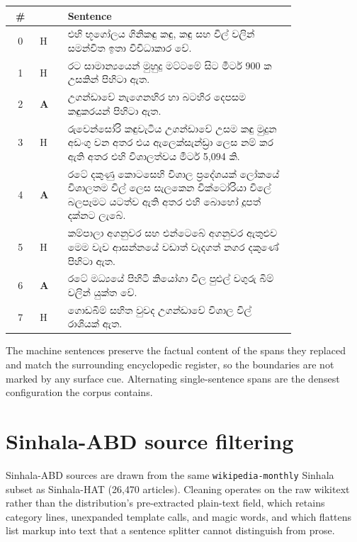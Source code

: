 \begin{table}[h]
\centering\small
\begin{tabular}{@{}cl p{0.80\linewidth}@{}}
\toprule
\# & & Sentence \\
\midrule
0 & H & \si{එහි භූගෝලය ගිනිකඳු කඳු, කඳු සහ විල් වලින් සමන්විත ඉතා විවිධාකාර වේ.} \\[2pt]
1 & H & \si{රට සාමාන්‍යයෙන් මුහුදු මට්ටමේ සිට මීටර් 900 ක උසකින් පිහිටා ඇත.} \\[2pt]
2 & \textbf{A} & \si{උගන්ඩාවේ නැගෙනහිර හා බටහිර දෙපසම කඳුකරයන් පිහිටා ඇත.} \\[2pt]
3 & H & \si{රුවෙන්සෝරි කඳුවැටිය උගන්ඩාවේ උසම කඳු මුදුන අඩංගු වන අතර එය ඇලෙක්සැන්ඩ්‍රා ලෙස නම් කර ඇති අතර එහි විශාලත්වය මීටර් 5,094 කි.} \\[2pt]
4 & \textbf{A} & \si{රටේ දකුණු කොටසෙහි විශාල ප්‍රදේශයක් ලෝකයේ විශාලතම විල් ලෙස සැලකෙන වික්ටෝරියා විලේ බලපෑමට යටත්ව ඇති අතර එහි බොහෝ දූපත් දක්නට ලැබේ.} \\[2pt]
5 & H & \si{කම්පාලා අගනුවර සහ එන්ටෙබේ අගනුවර ඇතුළුව මෙම වැව ආසන්නයේ වඩාත් වැදගත් නගර දකුණේ පිහිටා ඇත.} \\[2pt]
6 & \textbf{A} & \si{රටේ මධ්‍යයේ පිහිටි කියෝගා විල පුළුල් වගුරු බිම් වලින් යුක්ත වේ.} \\[2pt]
7 & H & \si{ගොඩබිම් සහිත වුවද උගන්ඩාවේ විශාල විල් රාශියක් ඇත.} \\
\bottomrule
\end{tabular}
\end{table}

\noindent The machine sentences preserve the factual content of the spans they
replaced and match the surrounding encyclopedic register, so the boundaries are
not marked by any surface cue. Alternating single-sentence spans are the densest
configuration the corpus contains.


\section{Sinhala-ABD source filtering}
\label{app:abd-cleaning}

Sinhala-ABD sources are drawn from the same \texttt{wikipedia-monthly} Sinhala
subset as Sinhala-HAT (26{,}470 articles). Cleaning operates on the raw wikitext
rather than the distribution's pre-extracted plain-text field, which retains
category lines, unexpanded template calls, and magic words, and which flattens
list markup into text that a sentence splitter cannot distinguish from prose.


